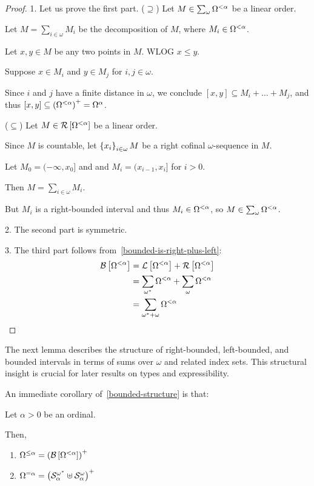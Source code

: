 \begin{proof}
  1. Let us prove the first part.
  ($\supseteq$) Let $M \in \sum_{\omega}{\Omega^{< \alpha}}$ be a linear order.

  Let $M = \sum_{i \in \omega} M_i$ be the decomposition of $M$,
  where $M_i \in \Omega^{< \alpha}$.

  Let $x, y \in M$ be any two points in $M$. WLOG $x \le y$.

  Suppose $x \in M_i$ and $y \in M_j$ for $i, j \in \omega$.

  Since $i$ and $j$ have a finite distance in $\omega$,
  we conclude $[x, y] \subseteq M_i + \ldots + M_j$,
  and thus $[x, y] \subseteq \left( {\Omega^{< \alpha}} \right)^+ = \Omega^{{\alpha}}$.

  ($\subseteq$) Let $M \in \mathcal{R} \left[ {{\Omega^{< \alpha}}} \right]$ be a linear order.

  Since $M$ is countable, let $\left\{ {x_i} \right\}_{i \in \omega} M$ be a right cofinal
  $\omega$-sequence in $M$.

  Let $M_0 = (-\infty, x_0]$ and and $M_i = (x_{i-1}, x_{i}]$ for $i > 0$.

  Then $M = \sum_{i \in \omega} M_i$.

  But $M_i$ is a right-bounded interval and thus $M_i \in \Omega^{< \alpha}$, so $M \in \sum_{\omega}{\Omega^{< \alpha}}$.

  2. The second part is symmetric.

  3. The third part follows from~\cref{bounded-is-right-plus-left}:
  \begin{align*}
    \mathcal{B} \left[ {{\Omega^{< \alpha}}} \right]
     & = \mathcal{L} \left[ {{\Omega^{< \alpha}}} \right] + \mathcal{R} \left[ {{\Omega^{< \alpha}}} \right]                     \\
     & = \sum_{\omega^\ast}{\Omega^{< \alpha}} + \sum_{\omega}{\Omega^{< \alpha}} \\
     & = \sum_{\omega^\ast + \omega}{\Omega^{< \alpha}}
  \end{align*}
\end{proof}

The next lemma describes the structure of right-bounded, left-bounded, and bounded intervals in terms of sums over $\omega$
and related index sets. This structural insight is crucial for later results on types and expressibility.

An immediate corollary of~\cref{bounded-structure} is that:
\begin{corollary}\label{le-alpha-corollary}
  Let $\alpha > 0$ be an ordinal.

  Then,
  \begin{enumerate}
    \item $\Omega^{\le \alpha} = \left( {\mathcal{B} \left[ {{\Omega^{< \alpha}}} \right]} \right)^+$
    \item $\Omega^{= \alpha}
            = \left( {
              \mathcal{S}^{\omega^\ast}_{\alpha}
              \uplus \mathcal{S}^{\omega}_{\alpha}
            } \right)^+$
  \end{enumerate}
\end{corollary}

